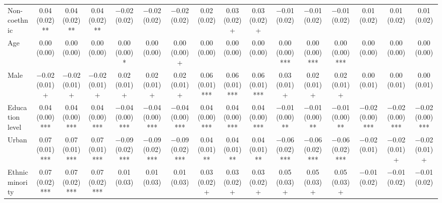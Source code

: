 \begin{table}
\begin{tabular}[t]{lccccccccccccccc}
Non-coethnic & \num{0.04} (\num{0.02})** & \num{0.04} (\num{0.02})** & \num{0.04} (\num{0.02})** & \num{-0.02} (\num{0.02}) & \num{-0.02} (\num{0.02}) & \num{-0.02} (\num{0.02}) & \num{0.02} (\num{0.02}) & \num{0.03} (\num{0.02})+ & \num{0.03} (\num{0.02})+ & \num{-0.01} (\num{0.02}) & \num{-0.01} (\num{0.02}) & \num{-0.01} (\num{0.02}) & \num{0.01} (\num{0.02}) & \num{0.01} (\num{0.02}) & \num{0.01} (\num{0.02})\\
Age & \num{0.00} (\num{0.00}) & \num{0.00} (\num{0.00}) & \num{0.00} (\num{0.00}) & \num{0.00} (\num{0.00})* & \num{0.00} (\num{0.00}) & \num{0.00} (\num{0.00})+ & \num{0.00} (\num{0.00}) & \num{0.00} (\num{0.00}) & \num{0.00} (\num{0.00}) & \num{0.00} (\num{0.00})*** & \num{0.00} (\num{0.00})*** & \num{0.00} (\num{0.00})*** & \num{0.00} (\num{0.00}) & \num{0.00} (\num{0.00}) & \num{0.00} (\num{0.00})\\
Male & \num{-0.02} (\num{0.01})+ & \num{-0.02} (\num{0.01})+ & \num{-0.02} (\num{0.01})+ & \num{0.02} (\num{0.01})+ & \num{0.02} (\num{0.01})+ & \num{0.02} (\num{0.01})+ & \num{0.06} (\num{0.01})*** & \num{0.06} (\num{0.01})*** & \num{0.06} (\num{0.01})*** & \num{0.03} (\num{0.01})+ & \num{0.02} (\num{0.01})+ & \num{0.02} (\num{0.01})+ & \num{0.00} (\num{0.01}) & \num{0.00} (\num{0.01}) & \num{0.00} (\num{0.01})\\
Education level & \num{0.04} (\num{0.00})*** & \num{0.04} (\num{0.00})*** & \num{0.04} (\num{0.00})*** & \num{-0.04} (\num{0.00})*** & \num{-0.04} (\num{0.00})*** & \num{-0.04} (\num{0.00})*** & \num{0.04} (\num{0.00})*** & \num{0.04} (\num{0.00})*** & \num{0.04} (\num{0.00})*** & \num{-0.01} (\num{0.00})** & \num{-0.01} (\num{0.00})** & \num{-0.01} (\num{0.00})** & \num{-0.02} (\num{0.00})*** & \num{-0.02} (\num{0.00})*** & \num{-0.02} (\num{0.00})***\\
Urban & \num{0.07} (\num{0.01})*** & \num{0.07} (\num{0.01})*** & \num{0.07} (\num{0.01})*** & \num{-0.09} (\num{0.02})*** & \num{-0.09} (\num{0.02})*** & \num{-0.09} (\num{0.02})*** & \num{0.04} (\num{0.01})** & \num{0.04} (\num{0.01})** & \num{0.04} (\num{0.01})** & \num{-0.06} (\num{0.02})*** & \num{-0.06} (\num{0.02})*** & \num{-0.06} (\num{0.02})*** & \num{-0.02} (\num{0.01}) & \num{-0.02} (\num{0.01})+ & \num{-0.02} (\num{0.01})+\\
Ethnic minority & \num{0.07} (\num{0.02})*** & \num{0.07} (\num{0.02})*** & \num{0.07} (\num{0.02})*** & \num{0.01} (\num{0.03}) & \num{0.01} (\num{0.03}) & \num{0.01} (\num{0.03}) & \num{0.03} (\num{0.02})+ & \num{0.03} (\num{0.02})+ & \num{0.03} (\num{0.02})+ & \num{0.05} (\num{0.03})+ & \num{0.05} (\num{0.03})+ & \num{0.05} (\num{0.03})+ & \num{-0.01} (\num{0.02}) & \num{-0.01} (\num{0.02}) & \num{-0.01} (\num{0.02})\\

\end{tabular}
\end{table}
